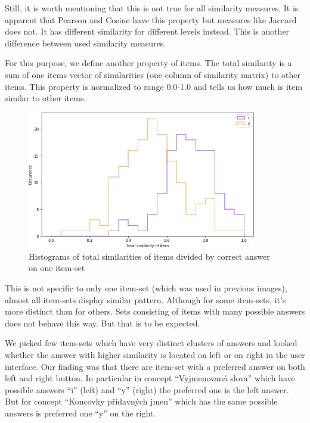 \documentclass[
  digital, %
  table,   %
  nolof,     %
  nolot,     %
  nocover,
  color,
  final, %
]{fithesis3}
\begin{document}
Still, it is worth mentioning that this is not true for all similarity measures. It is apparent that Pearson and Cosine have this property but measures like Jaccard does not. It has different similarity for different levels instead. This is another difference between used similarity measures.

For this purpose, we define another property of items. The total similarity is a sum of one items vector of similarities (one column of similarity matrix) to other items. This property is normalized to range 0.0-1.0 and tells us how much is item similar to other items.

\begin{figure}
  \includegraphics[width=10cm]{img/histogram_i_y}
  \caption{Histograms of total similarities of items divided by correct answer on one item-set}
  \label{fig:histogram_i_y}
\end{figure}



This is not specific to only one item-set (which was used in previous images), almost all item-sets display similar pattern. Although for some item-sets, it's more distinct than for others. Sets consisting of items with many possible answers does not behave this way. But that is to be expected.

We picked few item-sets which have very distinct clusters of answers and looked whether the answer with higher similarity is located on left or on right in the user interface. Our finding was that there are item-set with a preferred answer on both left and right button. In particular in concept ``Vyjmenovaná slova'' which have possible answers ``i'' (left) and ``y'' (right) the preferred one is the left answer. But for concept ``Koncovky přídavných jmen'' which has the same possible answers is preferred one ``y'' on the right.
\end{document}
